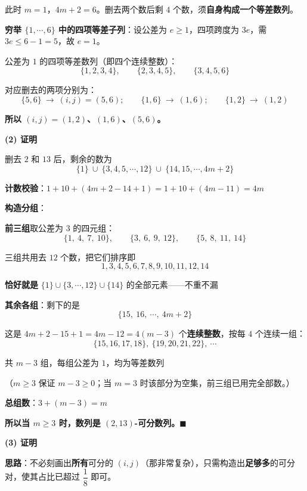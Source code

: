 \begin{answer}
此时 $m=1$，$4m+2=6$。删去两个数后剩 $4$ 个数，须\textbf{自身构成一个等差数列}。

\textbf{穷举 $\{1,\cdots,6\}$ 中的四项等差子列}：设公差为 $e\ge1$，四项跨度为 $3e$，需 $3e\le6-1=5$，故 $e=1$。

公差为 $1$ 的四项等差数列（即四个连续整数）：
\nopagebreak[4]
\[\{1,2,3,4\},\qquad\{2,3,4,5\},\qquad\{3,4,5,6\}\]

对应删去的两项分别为：
\nopagebreak[4]
\[\{5,6\}\ \to\ (i,j)=(5,6);\qquad \{1,6\}\ \to\ (1,6);\qquad \{1,2\}\ \to\ (1,2)\]

\textbf{所以 $(i,j)=(1,2)$、$(1,6)$、$(5,6)$。}

\par\medskip

\textbf{(2) 证明}

删去 $2$ 和 $13$ 后，剩余的数为
\nopagebreak[4]
\[\{1\}\ \cup\ \{3,4,5,\cdots,12\}\ \cup\ \{14,15,\cdots,4m+2\}\]

\textbf{计数校验}：$1+10+\left(4m+2-14+1\right)=1+10+(4m-11)=4m$ 

\textbf{构造分组}：

\textbf{前三组}取公差为 $3$ 的四元组：
\nopagebreak[4]
\[\{1,\ 4,\ 7,\ 10\},\qquad\{3,\ 6,\ 9,\ 12\},\qquad\{5,\ 8,\ 11,\ 14\}\]

三组共用去 $12$ 个数，把它们排序即
\nopagebreak[4]
\[1,3,4,5,6,7,8,9,10,11,12,14\]

\textbf{恰好就是} $\{1\}\cup\{3,\cdots,12\}\cup\{14\}$ 的全部元素——不重不漏 

\textbf{其余各组}：剩下的是
\nopagebreak[4]
\[\{15,\ 16,\ \cdots,\ 4m+2\}\]

这是 $4m+2-15+1=4m-12=4(m-3)$ 个\textbf{连续整数}，按每 $4$ 个连续一组：
\nopagebreak[4]
\[\{15,16,17,18\},\ \{19,20,21,22\},\ \cdots\]

共 $m-3$ 组，每组公差为 $1$，均为等差数列 

（$m\ge3$ 保证 $m-3\ge0$；当 $m=3$ 时该部分为空集，前三组已用完全部数。）

\textbf{总组数}：$3+(m-3)=m$ 

\textbf{所以当 $m\ge3$ 时，数列是 $(2,13)$-可分数列。$\blacksquare$}

\par\medskip

\textbf{(3) 证明}

\textbf{思路}：不必刻画出\textbf{所有}可分的 $(i,j)$（那非常复杂），只需构造出\textbf{足够多}的可分对，使其占比已超过 $\dfrac18$ 即可。


\end{answer}
